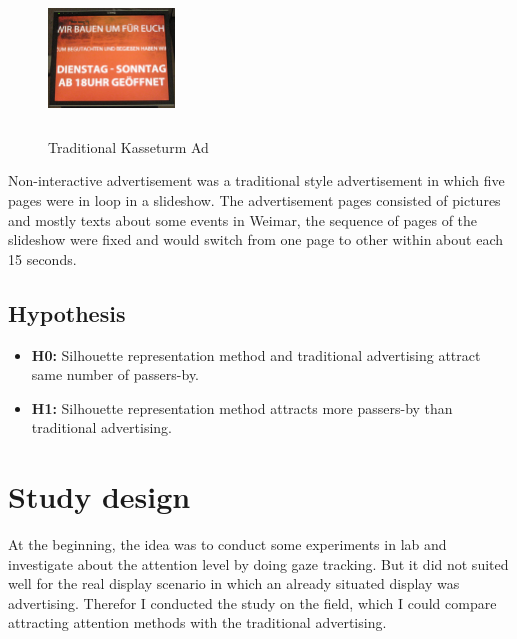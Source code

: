 \begin{figure}
  \vspace{-30pt}
  \begin{center}
    \includegraphics[width=0.3\textwidth,height=40mm]{Figures/3/non-interactive}
  \end{center}
  \vspace{-20pt}
  \caption{Traditional Kasseturm Ad }          
  \label{fig:Attraction_silhouette}
  \vspace{-20pt}
\end{figure} 
Non-interactive advertisement was a traditional style advertisement in which five pages were in loop in a slideshow. The advertisement pages consisted of pictures and mostly texts about some events in Weimar, the sequence of pages of the slideshow were fixed and would switch from one page to other within about each 15 seconds.
\break

\subsection{Hypothesis}

\begin{itemize}
\item \textbf{H0:} Silhouette representation method and traditional advertising attract same number of passers-by.
\item \textbf{H1:} Silhouette representation method attracts more passers-by than traditional advertising.

\end{itemize}



\section{Study design}
At the beginning, the idea was to conduct some experiments in lab and investigate about the attention level by doing gaze tracking. But it did not suited well for the real display scenario in which an already situated display was advertising. Therefor I conducted the study on the field, which I could compare attracting attention methods with the traditional advertising. 

